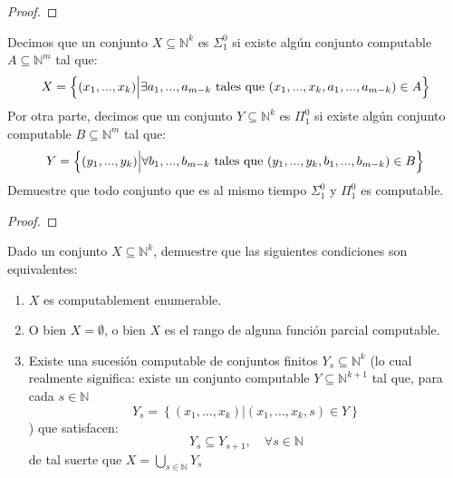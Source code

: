 \documentclass[12pt]{report}
\newcounter{it}
\theoremstyle{largebreak}
\begin{document}
    \begin{proof}
        
    \end{proof}

    \begin{excer}
        Decimos que un conjunto $X\subseteq\mathbb{N}^k$ es $\Sigma_1^0$ si existe algún conjunto computable $A\subseteq\mathbb{N}^m$ tal que:
        \begin{equation*}
            X=\left\{(x_1,...,x_k)\Big|\exists a_1,...,a_{ m-k}\textup{ tales que }(x_1,...,x_k,a_1,...,a_{m-k})\in A\right\}
        \end{equation*}
        Por otra parte, decimos que un conjunto $Y\subseteq\mathbb{N}^k$ es $\Pi_1^0$ si existe algún conjunto computable $B\subseteq\mathbb{N}^m$ tal que:
        \begin{equation*}
            Y=\left\{(y_1,...,y_k)\Big|\forall b_1,...,b_{ m-k}\textup{ tales que }(y_1,...,y_k,b_1,...,b_{m-k})\in B\right\}
        \end{equation*}
        Demuestre que todo conjunto que es al mismo tiempo $\Sigma_1^0$ y $\Pi_1^0$ es computable.
    \end{excer}

    \begin{proof}
        
    \end{proof}

    \begin{excer}
        Dado un conjunto $X\subseteq\mathbb{N}^k$, demuestre que las siguientes condiciones son equivalentes:
        \begin{enumerate}[label = \textit{(\alph*)}]
            \item $X$ es computablement enumerable.
            \item O bien $X=\emptyset$, o bien $X$ es el rango de alguna función parcial computable.
            \item Existe una sucesión computable de conjuntos finitos $Y_s\subseteq\mathbb{N}^k$ (lo cual realmente significa: existe un conjunto computable $Y\subseteq\mathbb{N}^{ k+1}$ tal que, para cada $s\in\mathbb{N}$
            \begin{equation*}
                Y_s=\left\{(x_1,...,x_k)\Big|(x_1,...,x_k,s)\in Y \right\}
            \end{equation*}
            ) que satisfacen:
            \begin{equation*}
                Y_s\subseteq Y_{ s+1},\quad\forall s\in\mathbb{N}
            \end{equation*}
            de tal suerte que $X=\bigcup_{ s\in\mathbb{N}}Y_s$
        \end{enumerate}
    \end{excer}
\end{document}
